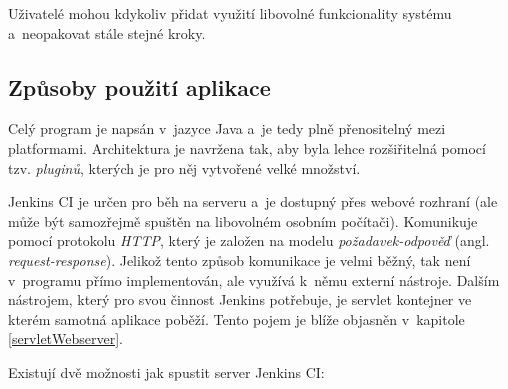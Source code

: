             Uživatelé mohou kdykoliv přidat využití libovolné funkcionality systému a~neopakovat stále stejné kroky. 
            

        \subsection{Způsoby použití aplikace}
            Celý program je napsán v~jazyce Java a~je tedy plně přenositelný mezi platformami. Architektura je navržena tak, aby byla 
            lehce rozšiřitelná pomocí tzv. \emph{pluginů}, kterých je pro něj vytvořené velké množství. 
            
            Jenkins CI je určen pro běh na serveru a~je dostupný přes webové rozhraní (ale může být samozřejmě spuštěn
            na libovolném osobním počítači). Komunikuje pomocí protokolu \emph{HTTP}, 
            který je založen na modelu \emph{požadavek-odpověď} (angl. \emph{request-response}). Jelikož tento způsob komunikace
            je velmi běžný, tak není v~programu přímo implementován, ale využívá k~němu externí nástroje. 
            Dalším nástrojem, který pro svou činnost Jenkins potřebuje, je servlet kontejner ve kterém samotná 
            aplikace poběží.
            Tento pojem je blíže objasněn v~kapitole \ref{servletWebserver}.

            \medskip \noindent
            Existují dvě možnosti jak spustit server Jenkins CI:

